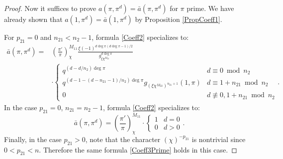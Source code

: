\documentclass[11pt,letterpaper]{article}
\theoremstyle{definition}
\theoremstyle{remark}
\numberwithin{equation}{section}
\theoremstyle{dotless}
\newcommand{\res}[2]{\left(\frac{#1}{#2}\right)}
\begin{document}
\begin{proof}

Now it suffices to prove $a(\pi, \pi^d)=\bar{a}(\pi, \pi^d)$ for $\pi$ prime. We have already shown that $a(1, \pi^d)=\bar{a}(1, \pi^d)$ by Proposition \ref{PropCoeff1}.

For $p_{21}=0$ and $n_{21} < n_2-1$, formula \eqref{Coeff2} specializes to:
\begin{equation}\label{Coeff2Prime}
\begin{split}
\bar{a}(\pi, \pi^d) = & \res{\pi'}{\pi}_{\chi}^{M_{11}} \frac{\xi(-1)^{d \deg \pi(d \deg \pi -1)/2}}{g_{\xi \chi^{M_{22}}}^{d \deg \pi}} \\
& \cdot \left\lbrace \begin{array}{cc} 
q^{(d-d/n_2) \deg \pi} & d \equiv 0 \bmod n_2 \\ 
q^{(d-1 - (d-n_{21}-1)/n_2) \deg \pi }g_{(\xi \chi^{M_{22}})^{n_{21}+1}}(1, \pi) & d \equiv 1+n_{21} \bmod n_2 \\ 
0 & d \not\equiv 0, 1+n_{21} \bmod n_2 
\end{array} \right. .
\end{split}
\end{equation}
In the case $p_{21}=0$, $n_{21} = n_2-1$, formula \eqref{Coeff2} specializes to: 
\begin{equation} \label{Coeff3Prime}
\bar{a}(\pi, \pi^{d}) = \res{\pi'}{\pi}_{\chi}^{M_{11}} \cdot \left\lbrace \begin{array}{cc} 1 & d=0 \\  0 & d>0 \end{array}\right. .
\end{equation}
Finally, in the case $p_{21}>0$, note that the character $(\chi )^{-p_{21}}$ is nontrivial since $0<p_{21}<n$. Therefore the same formula \eqref{Coeff3Prime} holds in this case. 


\end{proof}
\end{document}
